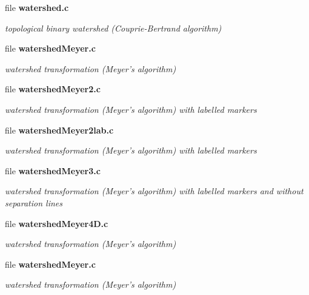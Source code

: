 \begin{CompactItemize}
\item 
file {\bf watershed.c}
\begin{CompactList}\small\item\em topological binary watershed (Couprie-Bertrand algorithm) \item\end{CompactList}

\item 
file {\bf watershedMeyer.c}
\begin{CompactList}\small\item\em watershed transformation (Meyer's algorithm) \item\end{CompactList}

\item 
file {\bf watershedMeyer2.c}
\begin{CompactList}\small\item\em watershed transformation (Meyer's algorithm) with labelled markers \item\end{CompactList}

\item 
file {\bf watershedMeyer2lab.c}
\begin{CompactList}\small\item\em watershed transformation (Meyer's algorithm) with labelled markers \item\end{CompactList}

\item 
file {\bf watershedMeyer3.c}
\begin{CompactList}\small\item\em watershed transformation (Meyer's algorithm) with labelled markers and without separation lines \item\end{CompactList}

\item 
file {\bf watershedMeyer4D.c}
\begin{CompactList}\small\item\em watershed transformation (Meyer's algorithm) \item\end{CompactList}

\item 
file {\bf watershedMeyer.c}
\begin{CompactList}\small\item\em watershed transformation (Meyer's algorithm) \item\end{CompactList}


\end{CompactItemize}

